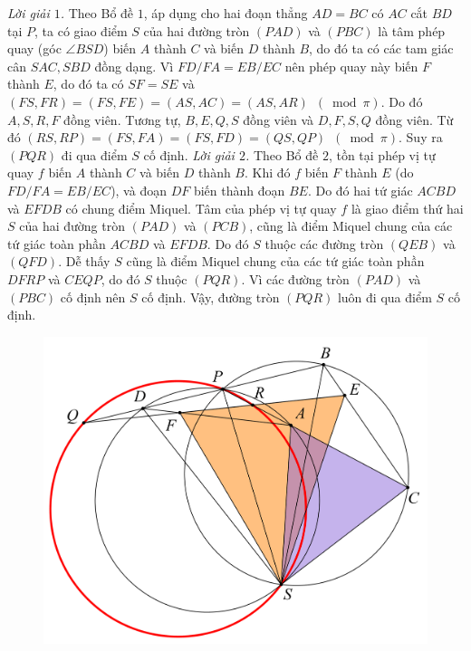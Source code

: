 \begin{multicols}{2}
\begin{figure}[H]
		\vspace*{-15pt}
	\end{figure}
	\textit{Lời giải $1$.} Theo Bổ đề $1$, áp dụng cho hai đoạn thẳng $AD=BC$ có $AC$ cắt $BD$ tại $P$,  ta có giao điểm $S$ của hai đường tròn $(PAD)$ và $(PBC)$ là tâm phép quay (góc  $ \angle BSD$) biến $A$ thành $C$ và biến $D$ thành $B$, do đó ta có các tam giác cân $SAC,SBD$ đồng dạng. Vì $FD/FA=EB/EC$ nên phép quay này biến $F$ thành $E$, do đó ta có $SF=SE$ và $(FS, FR)=(FS, FE)=(AS, AC)=(AS, AR)\,\,\,(\bmod \pi)$. Do đó $A,S, R, F$ đồng viên. Tương tự, $B, E, Q, S$ đồng viên và $D, F, S, Q$ đồng viên. Từ đó $(RS, RP)=(FS, FA)=(FS, FD)=(QS, QP)\,\,\,(\bmod \pi)$. Suy ra $(PQR)$ đi qua điểm $S$ cố định.
	\vskip 0.1cm
	\textit{Lời giải $2$.} Theo Bổ đề $2$, tồn tại phép vị tự quay $f$ biến $A$ thành $C$ và biến $D$ thành $B$. Khi đó $f$ biến $ F$ thành $E$ (do $FD/FA=EB/EC$), và đoạn $DF$ biến thành đoạn $BE$. Do đó hai tứ giác $ACBD$ và $EFDB$ có chung điểm Miquel. Tâm của phép vị tự quay $f$ là giao điểm thứ hai $S$ của hai đường tròn $(PAD)$ và $(PCB)$, cũng là điểm Miquel chung của các tứ giác toàn phần $ACBD$ và $EFDB$. Do đó $S$ thuộc các đường tròn $(QEB)$ và $(QFD)$. Dễ thấy $S$ cũng là điểm Miquel chung của các tứ giác toàn phần $DFRP$ và $CEQP$, do đó $S$ thuộc $(PQR)$. Vì các đường tròn $(PAD)$ và $(PBC)$ cố định nên $S$ cố định. Vậy, đường tròn $(PQR)$ luôn đi qua điểm $S$ cố định. 
	\begin{figure}[H]
		\centering
		\captionsetup{labelformat= empty, justification=centering}
		\includegraphics[width= 1\linewidth]{15}

\end{figure}
\end{multicols}
